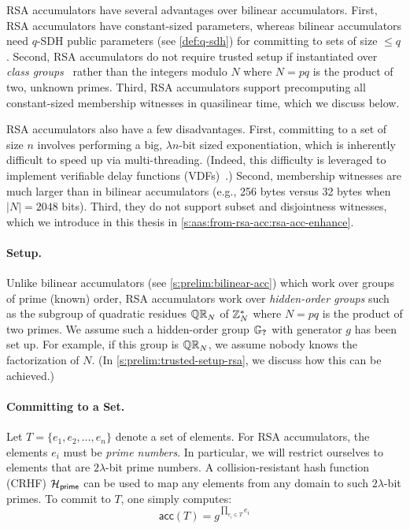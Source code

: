 RSA accumulators have several advantages over bilinear accumulators.
First, RSA accumulators have constant-sized parameters, whereas bilinear accumulators need $q$-SDH public parameters (see \cref{def:q-sdh}) for committing to sets of size $\le q$.
Second, RSA accumulators do not require trusted setup if instantiated over \textit{class groups}~\cite{BBF19,Lipmaa2012} rather than the integers modulo $N$ where $N=pq$ is the product of two, unknown primes.
Third, RSA accumulators support precomputing all constant-sized membership witnesses in quasilinear time, which we discuss below.

RSA accumulators also have a few disadvantages.
First, committing to a set of size $n$ involves performing a big, $\lambda n$-bit sized exponentiation, which is inherently difficult to speed up via multi-threading.
(Indeed, this difficulty is leveraged to implement verifiable delay functions (VDFs)~\cite{Wesolowski19,Pietrzak2018,Boneh2018ASurvey}.)
Second, membership witnesses are much larger than in bilinear accumulators (e.g., 256 bytes versus 32 bytes when $|N|=2048$ bits).
Third, they do not support subset and disjointness witnesses, which we introduce in this thesis in \cref{s:aas:from-rsa-acc:rsa-acc-enhance}.

\paragraph{Setup.}
Unlike bilinear accumulators (see \cref{s:prelim:bilinear-acc}) which work over groups of prime (known) order, RSA accumulators work over \textit{hidden-order groups} such as the subgroup of quadratic residues $\mathbb{QR}_N$ of $\mathbb{Z}_N^*$ where $N=pq$ is the product of two primes.
We assume such a hidden-order group $\mathbb{G}_{\textbf{?}}$ with generator $g$ has been set up.
For example, if this group is $\mathbb{QR}_N$, we assume nobody knows the factorization of $N$.
(In \cref{s:prelim:trusted-setup-rsa}, we discuss how this can be achieved.)

\paragraph{Committing to a Set.}
Let $T = \{e_1, e_2, \dots, e_n\}$ denote a set of elements.
For RSA accumulators, the elements $e_i$ must be \textit{prime numbers}.
In particular, we will restrict ourselves to elements that are $2\lambda$-bit prime numbers.
A collision-resistant hash function (CRHF) $\mathcal{H}_{\mathsf{prime}}$ can be used to map any elements from any domain to such $2\lambda$-bit primes.
To commit to $T$, one simply computes:
$$\mathsf{acc}(T) = g^{\prod_{e_i\in T} e_i}$$

